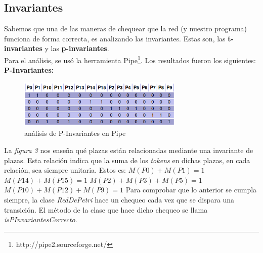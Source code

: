 \documentclass{article}
\begin{document}
    \subsection{Invariantes}
    \begin{flushleft}
        Sabemos que una de las maneras de chequear que la red (y nuestro programa) funciona 
        de forma correcta, es analizando las invariantes. Estas son, las \textbf{t-invariantes}
        y las \textbf{p-invariantes}. \\
        Para el análisis, se usó la herramienta Pipe\footnote{http://pipe2.sourceforge.net/}.
        Los resultados fueron los siguientes: \newline \newline
        \textbf{P-Invariantes:} \\
        \begin{figure}[h]
            \includegraphics[width=0.7\textwidth, center]{p-invariante.png}
            \caption{análisis de P-Invariantes en Pipe}
        \end{figure}
        La \emph{figura 3} nos enseña qué plazas están relacionadas mediante una invariante de
        plazas. Esta relación indica que la suma de los \emph{tokens} en dichas plazas, en cada
        relación, sea siempre unitaria. Estos es: \newline \newline
        $M(P0) + M(P1) = 1$ \newline \newline
        $M(P14) + M(P15) = 1$ \newline \newline
        $M(P2) + M(P3) + M(P5) = 1$ \newline \newline
        $M(P10) + M(P12) + M(P9) = 1$ \newline \newline
        Para comprobar que lo anterior se cumpla siempre, la clase \emph{RedDePetri} hace un 
        chequeo cada vez que se dispara una transición. El método de la clase que hace dicho
        chequeo se llama \emph{isPInvariantesCorrecto}. \newline \newline

\end{flushleft}
\end{document}
